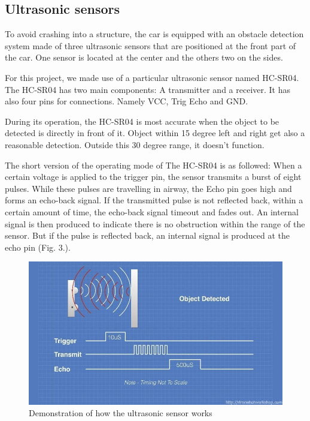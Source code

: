 \documentclass[conference]{IEEEtran}
\begin{document}
\subsection{Ultrasonic sensors}
To avoid crashing into a structure, the car is equipped with an obstacle detection system made of three ultrasonic sensors that are positioned at the front part of the car. One sensor is located at the center and the others two on the sides.

For this project, we made use of a particular ultrasonic sensor named HC-SR04. The HC-SR04 has two main components: A transmitter and a receiver. It has also four pins for connections. Namely VCC, Trig Echo and GND.

During its operation, the HC-SR04 is most accurate when the object to be detected is directly in front of it. Object within 15 degree left and right get also a reasonable detection.  Outside this 30 degree range, it doesn't function.

The short version of the operating mode of The HC-SR04 is as followed: 
When a certain voltage is applied to the trigger pin, the sensor transmits a burst of eight pulses. While these pulses are travelling in airway, the Echo pin goes high and forms an echo-back signal.
If the transmitted pulse is not reflected back, within a certain amount of time, the echo-back signal timeout and fades out. An internal signal is then produced to indicate there is no obstruction within the range of the sensor. 
But if the pulse is reflected back, an internal signal is produced at the echo pin (Fig. 3.). 
\begin{figure}[h!]
	\includegraphics[width=\linewidth]{USSin.jpg}
	\caption{Demonstration of how the ultrasonic sensor works}
	\label{fig:UMLSM1}
\end{figure}
\end{document}
